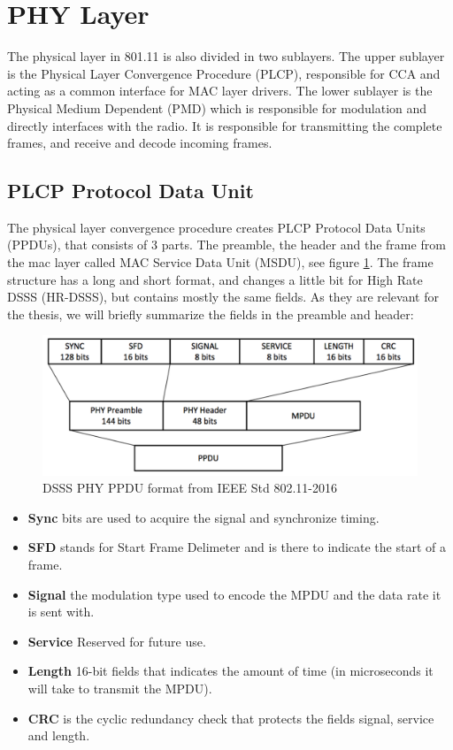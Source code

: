 {	\section{PHY Layer}
	The physical layer in 801.11 is also divided in two sublayers. The upper sublayer is the Physical Layer Convergence Procedure (PLCP), responsible for CCA and acting
	as a common interface for MAC layer drivers. The lower sublayer is the Physical Medium Dependent (PMD) which is responsible for modulation and directly interfaces with
	the radio. It is responsible for transmitting the complete frames, and receive
	and decode incoming frames. 

	\subsection{PLCP Protocol Data Unit}
	The physical layer convergence procedure creates PLCP Protocol Data Units (PPDUs), 
	that consists of 3 parts. The preamble, the header and the frame from the mac layer
	called MAC Service Data Unit (MSDU), see figure \ref{fig:PPDU}. The frame structure
	has a long and short format, and changes a little bit for High Rate DSSS (HR-DSSS),
	but contains mostly the same fields. As they are relevant for the thesis,
	we will briefly summarize the fields in the preamble and header:

	\begin{figure}
	\center
	\includegraphics[scale=0.5]{Images/PPDU.png}
	\caption{DSSS PHY PPDU format from IEEE Std 802.11-2016  }
	\label{fig:PPDU}
	\end{figure}


	\begin{itemize}
	\item \textbf{Sync} bits are used to acquire the signal and synchronize timing. 
	\item \textbf{SFD} stands for Start Frame Delimeter and is there to indicate the start of a frame.  
	\item \textbf{Signal} the modulation type used to encode the MPDU and
	the data rate it is sent with. 
	\item \textbf{Service} Reserved for future use. 
	\item \textbf{Length} 16-bit fields that indicates the amount of time (in
			microseconds it will take to transmit the MPDU).
	\item \textbf{CRC} is the cyclic redundancy check that protects
	the fields signal, service and length. 
	\end{itemize}

}

